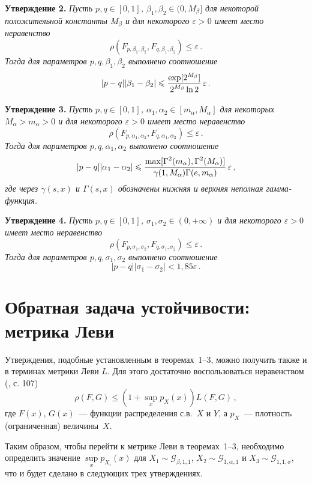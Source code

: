\begin{multicols}{2}
\medskip

\noindent
\textbf{Утверждение 2.}
\textit{Пусть $p, q\in[0,1]$, $\beta_1,\beta_2\in (0, M_{\beta}]$ для
некоторой положительной константы $M_{\beta}$ и для некоторого
$\varepsilon>0$ имеет место неравенство}
$$
\rho(F_{p,\beta_1,\beta_2},F_{q,\beta_1,\beta_2}) \leqslant
\varepsilon\,.
$$
\textit{Тогда для параметров $p, q, \beta_1,\beta_2$ выполнено соотношение}
$$
|p-q| |\beta_1-\beta_2| \leqslant
\displaystyle\frac{\displaystyle \exp[2^{M_{\beta}}]\mathstrut}{\displaystyle 2^{M_{\beta}} \ln2\mathstrut}\,\varepsilon\,.
$$

\medskip

\noindent
\textbf{Утверждение 3.}
\textit{Пусть $p,q \in[0,1]$, $\alpha_1,\alpha_2 \in [m_{\alpha},
M_{\alpha}]$ для некоторых $M_{\alpha}>m_{\alpha}>0$ и для
некоторого $\varepsilon>0$ имеет место неравенство}
$$
\rho(F_{p,\alpha_1,\alpha_2}, F_{q,\alpha_1,\alpha_2} ) \leqslant
\varepsilon\,.
$$
\textit{Тогда для параметров $p,q,\alpha_1,\alpha_2$ выполнено соотношение}
$$
|p-q| |\alpha_1-\alpha_2| \leqslant \displaystyle\frac{\displaystyle  \max
[\Gamma^2(m_{\alpha}),\Gamma^2(M_{\alpha})]\mathstrut}{\displaystyle \gamma(1,M_{\alpha})\Gamma(e,m_{\alpha})\mathstrut}
\, \varepsilon\,,
$$
\textit{где через $\gamma(s,x)$ и $\Gamma(s,x)$ обозначены нижняя и
верхняя неполная гамма-функция.}

\medskip

\noindent
\textbf{Утверждение 4.}
\textit{Пусть $p,q\in[0,1]$, $\sigma_1,\sigma_2 \in (0,+\infty)$ и для
некоторого $\varepsilon>0$ имеет место неравенство}
$$
\rho(F_{p,\sigma_1,\sigma_2}, F_{q,\sigma_1,\sigma_2} ) \leqslant \varepsilon\,.
$$
\textit{Тогда для параметров $p,q,\sigma_1,\sigma_2$ выполнено соотношение}
$$
|p-q| |\sigma_1-\sigma_2| < 1{,}85 \varepsilon\,.
$$


\section{Обратная задача устойчивости: метрика Леви}

Утверждения, подобные установленным в
теоремах~1--3, можно получить также и в
терминах метрики Леви $L$. Для этого достаточно воспользоваться
неравенством (\cite{Zolotarev1986}, с. 107)
$$
\rho(F,G) \leqslant (1+\sup\limits_x p_X(x)) L(F,G)\,,
$$
где $F(x)$, $G(x)$~--- функции распределения с.в.\ $X$ и $Y$, а
$p_X$~--- плотность (ограниченная) величины~$X$.

Таким образом, чтобы перейти к метрике Леви в
теоремах~1--3, необходимо определить значение
$\sup\limits_x p_{X_i}(x)$ для $X_1\sim{\mathcal G}_{\beta,1,1}$,
$X_2\sim{\mathcal G}_{1,\alpha,1}$ и $X_3\sim{\mathcal
G}_{1,1,\sigma}$, что и будет сделано в следующих трех
утверждениях.


\end{multicols}
